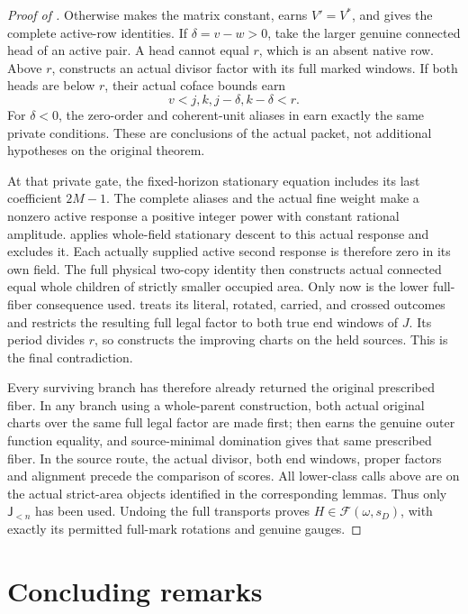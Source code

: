\documentclass[11pt,a4paper]{amsart}
\numberwithin{equation}{section}
\theoremstyle{plain}
\theoremstyle{definition}
\newcommand{\Jlower}{\mathsf J_{<n}}
\begin{document}
\begin{proof}[Proof of ]
Otherwise  makes the matrix constant, earns
\(V'=V^*\), and gives the complete active-row identities.  If
\(\delta=v-w>0\), take the larger genuine connected head of an
active pair.  A head cannot equal \(r\), which is an absent native
row.  Above \(r\),  constructs an actual divisor
factor with its full marked windows.  If both heads are below \(r\),
their actual coface bounds earn
\[
 v<j,k,j-\delta,k-\delta<r.
\]
For \(\delta<0\), the zero-order and coherent-unit aliases in
 earn exactly the same private conditions.
These are conclusions of the actual packet, not additional hypotheses
on the original theorem.

At that private gate, the fixed-horizon stationary equation includes
its last coefficient \(2M-1\).  The complete aliases and the actual
fine weight make a nonzero active response a positive integer power
with constant rational amplitude.   applies whole-field
stationary descent to this actual response and excludes it.
Each actually supplied active second response is therefore zero in
its own field.  The full physical
two-copy identity then constructs actual connected equal whole children
of strictly smaller occupied area.  Only now is the lower full-fiber
consequence used.   treats its literal,
rotated, carried, and crossed outcomes and restricts the resulting
full legal factor to both true end windows of \(J\).  Its period
divides \(r\), so  constructs the improving
charts on the held sources.  This is the final contradiction.

Every surviving branch has therefore already returned the original
prescribed fiber.  In any branch using a whole-parent construction,
both actual original charts over the same full legal factor are made
first;  then earns the genuine outer
function equality, and source-minimal domination gives that same
prescribed fiber.  In the source route, the actual divisor, both end
windows, proper factors and alignment precede the comparison of scores.
All lower-class calls above are on the actual strict-area objects
identified in the corresponding lemmas.  Thus only \(\Jlower\) has
been used.  Undoing the full transports proves
\(H\in\mathcal F(\omega,s_D)\), with exactly its permitted
full-mark rotations and genuine gauges.
\end{proof}

\section{Concluding remarks}\label{sec:conclusion}
\end{document}
